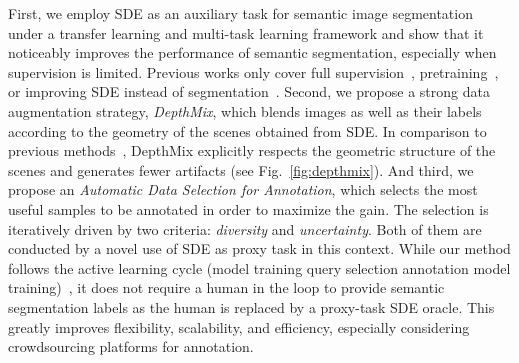 \documentclass[final]{cvpr}
\begin{document}
First, we employ SDE as an auxiliary task for semantic image segmentation under a transfer learning and multi-task learning framework and show that it  noticeably improves the performance of semantic segmentation, especially when supervision is limited. Previous works only cover full supervision~\cite{klingner2020self}, pretraining~\cite{jiang2018self}, or improving SDE instead of segmentation~\cite{guizilini2020semantically}.
Second, we propose a strong data augmentation strategy, \emph{DepthMix}, which blends images as well as their labels according to the geometry of the scenes obtained from SDE. In comparison to previous methods~\cite{yun2019cutmix, olsson2020classmix}, DepthMix explicitly respects the geometric structure of the scenes and generates fewer artifacts (see Fig.~\ref{fig:depthmix}). 
And third, we propose an \emph{Automatic Data Selection for Annotation}, which selects the most useful samples to be annotated in order to maximize the gain. The selection is iteratively driven by two criteria: \emph{diversity} and \emph{uncertainty}. Both of them are conducted by a novel use of SDE as proxy task in this context.
While our method follows the active learning cycle (model training  query selection  annotation  model training)~\cite{settles2009active, yang2017suggestive}, it does not require a human in the loop to provide semantic segmentation labels as the human is replaced by a proxy-task SDE oracle. This greatly improves flexibility, scalability, and efficiency, especially considering crowdsourcing platforms for annotation.
\end{document}
